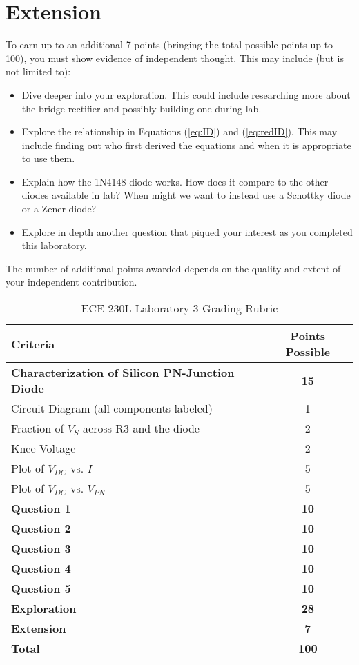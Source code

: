 \documentclass[12pt]{../manual}
\begin{document}
\section{Extension}
To earn up to an additional 7 points (bringing the total possible points up to 100), you must show evidence of independent thought. This may include (but is not limited to):
\renewcommand\labelitemi{\textbullet}
\begin{itemize}
\item Dive deeper into your exploration. This could include researching more about the bridge rectifier and possibly building one during lab.
\item Explore the relationship in Equations (\ref{eq:ID}) and (\ref{eq:redID}). This may include finding out who first derived the equations and when it is appropriate to use them.
\item Explain how the 1N4148 diode works. How does it compare to the other diodes available in lab? When might we want to instead use a Schottky diode or a Zener diode?
\item Explore in depth another question that piqued your interest as you completed this laboratory.
\end{itemize}
The number of additional points awarded depends on the quality and extent of your independent contribution.

\newpage
{}
{}
\hspace{0pt}
\vfill %
\begin{table}[ht!]
\caption{ECE 230L Laboratory 3 Grading Rubric}
\centering
\begin{tabular}{l|c} \hline
Criteria & Points Possible \\ \hline \hline
\textbf{Characterization of Silicon PN-Junction Diode}	& \textbf{15} \\ 
Circuit Diagram (all components labeled) 				& 1 \\ 
 Fraction of $V_{S}$ across R3 and the diode			& 2 \\ 
Knee Voltage											& 2 \\ 
Plot of $V_{DC}$ vs. $I$								& 5 \\ 
Plot of $V_{DC}$ vs. $V_{PN}$									& 5 \\ \hline
\textbf{Question 1}										& \textbf{10} \\ \hline
\textbf{Question 2}										& \textbf{10} \\ \hline
\textbf{Question 3}										& \textbf{10} \\ \hline
\textbf{Question 4}										& \textbf{10} \\ \hline
\textbf{Question 5}										& \textbf{10} \\ \hline
\textbf{Exploration}									& \textbf{28} \\ \hline
\textbf{Extension}										& \textbf{7} \\ \hline \hline
\textbf{Total}											& \textbf{100} \\ \hline
\end{tabular}
\end{table}
\vfill %
\end{document}
